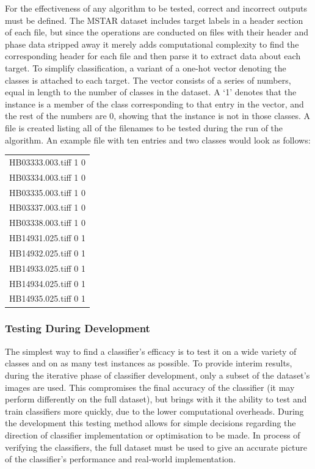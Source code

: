 For the effectiveness of any algorithm to be tested, correct and incorrect outputs must be defined. The MSTAR dataset includes target labels in a header section of each file, but since the operations are conducted on files with their header and phase data stripped away it merely adds computational complexity to find the corresponding header for each file and then parse it to extract data about each target. 
To simplify classification, a variant of a one-hot vector denoting the classes is attached to each target. The vector consists of a series of numbers, equal in length to the number of classes in the dataset. A `1' denotes that the instance is a member of the class corresponding to that entry in the vector, and the rest of the numbers are 0, showing that the instance is not in those classes. A file is created listing all of the filenames to be tested during the run of the algorithm. An example file with ten entries and two classes would look as follows:\\

\begin{center}
\begin{tabular}{c}
HB03333.003.tiff 1 0 \\
HB03334.003.tiff 1 0 \\
HB03335.003.tiff 1 0 \\
HB03337.003.tiff 1 0 \\
HB03338.003.tiff 1 0 \\
HB14931.025.tiff 0 1 \\
HB14932.025.tiff 0 1 \\
HB14933.025.tiff 0 1 \\
HB14934.025.tiff 0 1 \\
HB14935.025.tiff 0 1 \\


\end{tabular}
\end{center}

\subsubsection{Testing During Development}
The simplest way to find a classifier's efficacy is to test it on a wide variety of classes and on as many test instances as possible. To provide interim results, during the iterative phase of classifier development, only a subset of the dataset's images are used. This compromises the final accuracy of the classifier (it may perform differently on the full dataset), but brings with it the ability to test and train classifiers more quickly, due to the lower computational overheads. During the development this testing method allows for simple decisions regarding the direction of classifier implementation or optimisation to be made. In process of verifying the classifiers, the full dataset must be used to give an accurate picture of the classifier's performance and real-world implementation. 

